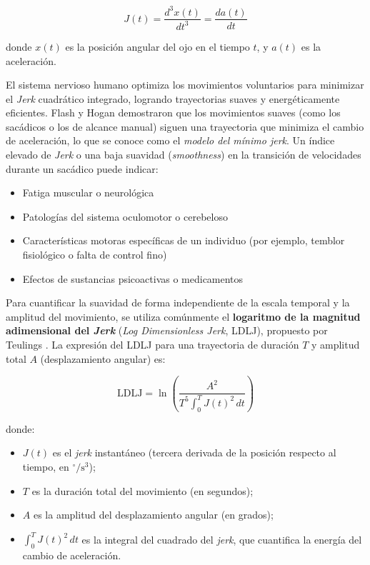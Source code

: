 \begin{equation}
	J(t) = \frac{d^3 x(t)}{dt^3} = \frac{da(t)}{dt} \tag{4}
\end{equation}

donde $x(t)$ es la posición angular del ojo en el tiempo $t$, y $a(t)$ es la aceleración.

El sistema nervioso humano optimiza los movimientos voluntarios para minimizar el \textit{Jerk} cuadrático integrado, logrando trayectorias suaves y energéticamente eficientes. Flash y Hogan \cite{flash1985coordination} demostraron que los movimientos suaves (como los sacádicos o los de alcance manual) siguen una trayectoria que minimiza el cambio de aceleración, lo que se conoce como el \textit{modelo del mínimo jerk}. Un índice elevado de \textit{Jerk} o una baja suavidad (\textit{smoothness}) en la transición de velocidades durante un sacádico puede indicar:

\begin{itemize}
	\item Fatiga muscular o neurológica
	\item Patologías del sistema oculomotor o cerebeloso
	\item Características motoras específicas de un individuo (por ejemplo, temblor fisiológico o falta de control fino)
	\item Efectos de sustancias psicoactivas o medicamentos
\end{itemize}

Para cuantificar la suavidad de forma independiente de la escala temporal y la amplitud del movimiento, se utiliza comúnmente el \textbf{logaritmo de la magnitud adimensional del \textit{Jerk}} (\textit{Log Dimensionless Jerk}, LDLJ), propuesto por Teulings \cite{teulings1996jerk}. La expresión del LDLJ para una trayectoria de duración $T$ y amplitud total $A$ (desplazamiento angular) es:

\begin{equation}
	\text{LDLJ} = \ln\left( \frac{A^2}{T^5 \displaystyle \int_{0}^{T} J(t)^2 \, dt} \right) \tag{5}
\end{equation}

donde:
\begin{itemize}
	\item $J(t)$ es el \textit{jerk} instantáneo (tercera derivada de la posición respecto al tiempo, en $\mathrm{^\circ/s^3}$);
	\item $T$ es la duración total del movimiento (en segundos);
	\item $A$ es la amplitud del desplazamiento angular (en grados);
	\item $\displaystyle \int_{0}^{T} J(t)^2 \, dt$ es la integral del cuadrado del \textit{jerk}, que cuantifica la energía del cambio de aceleración.
\end{itemize}

